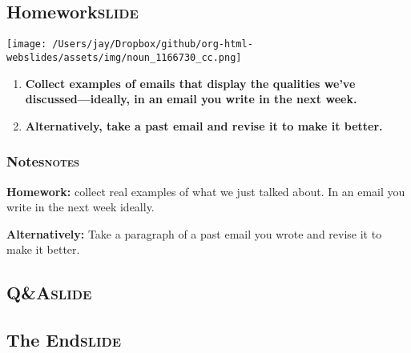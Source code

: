 \documentclass[11pt]{article}
\begin{document}
\subsection{Homework\hfill{}\textsc{slide}}
\label{sec:orgc95822c}

\begin{center}
\texttt{[image: /Users/jay/Dropbox/github/org-html-webslides/assets/img/noun\_1166730\_cc.png]}
\end{center}

\begin{enumerate}
\item \textbf{Collect examples of emails that display the qualities we've discussed---ideally, in an email you write in the next week.}
\item \textbf{Alternatively, take a past email and revise it to make it better.}
\end{enumerate}


\subsubsection{Notes\hfill{}\textsc{notes}}
\label{sec:org8f324b2}
\textbf{Homework:} collect real examples of what we just talked about. In an email you write in the next week ideally.

\textbf{Alternatively:} Take a paragraph of a past email you wrote and revise it to make it better.

\subsection{Q\&A\hfill{}\textsc{slide}}
\label{sec:org181e38a}

\subsection{The End\hfill{}\textsc{slide}}
\label{sec:org4871bd0}
\end{document}
